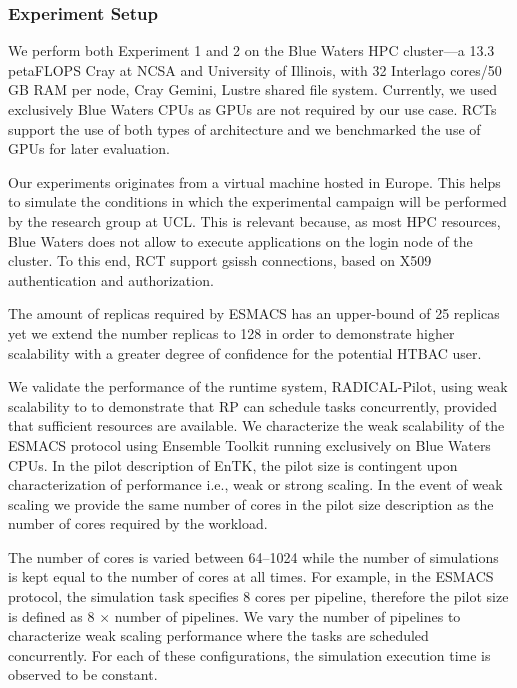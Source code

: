 
\subsubsection{Experiment Setup}

We perform both Experiment 1 and 2 %
on the Blue Waters HPC cluster---a 13.3 petaFLOPS Cray at NCSA and University
of Illinois, with 32 Interlago cores/50 GB RAM per node, Cray Gemini, Lustre
shared file system. Currently, we used exclusively Blue Waters CPUs as GPUs
are not required by our use case. RCTs support the use of both types of
architecture and we benchmarked the use of GPUs for later evaluation.

Our experiments originates from a virtual machine hosted in Europe. This
helps to simulate the conditions in which the experimental campaign will be
performed by the research group at UCL\@. This is relevant because, as most
HPC resources, Blue Waters does not allow to execute applications on the
login node of the cluster. To this end, RCT support gsissh connections, based
on X509 authentication and authorization.


The amount of replicas required by ESMACS has an upper-bound of 25 replicas
yet we extend the number replicas to 128 in order to demonstrate higher
scalability with a greater degree of confidence for the potential HTBAC user.


We validate the performance of the runtime system, RADICAL-Pilot, using weak
scalability to to demonstrate that RP can schedule tasks concurrently,
provided that sufficient resources are available. We characterize the weak
scalability of the ESMACS protocol using Ensemble Toolkit running exclusively
on Blue Waters CPUs. In the pilot description of EnTK, the pilot size is
contingent upon characterization of performance i.e., weak or strong scaling.
In the event of weak scaling we provide the same number of cores in the pilot
size description as the number of cores required by the workload.

The number of cores is varied between 64--1024 while the number of
simulations is kept equal to the number of cores at all times. For example,
in the ESMACS protocol, the simulation task specifies 8 cores per pipeline,
therefore the pilot size is defined as 8 $\times$ number of pipelines. We
vary the number of pipelines to characterize weak scaling performance where
the tasks are scheduled concurrently. For each of these configurations, the
simulation execution time is observed to be constant.

